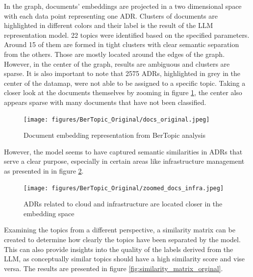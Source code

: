         In the graph, documents' embeddings are projected in a two dimensional space with each data point representing one ADR. Clusters of documents are highlighted in different colors and their label is the result of the LLM representation model. 22 topics were identified based on the specified parameters. Around 15 of them are formed in tight clusters with clear semantic separation from the others. Those are mostly located around the edges of the graph. However, in the center of the graph, results are ambiguous and clusters are sparse. It is also important to note that 2575 ADRs, highlighted in grey in the center of the datamap, were not able to be assigned to a specific topic. Taking a closer look at the documents themselves by zooming in figure \ref{fig:docs_original}, the center also appears sparse with many documents that have not been classified. 
        
        \begin{figure}[h]
            \centering
            \hspace*{-2.2cm} 
            \texttt{[image: figures/BerTopic\_Original/docs\_original.jpeg]}
            \caption{Document embedding representation from BerTopic analysis}
            \label{fig:docs_original}
        \end{figure}
        
        However, the model seems to have captured semantic similarities in ADRs that serve a clear purpose, especially in certain areas like infrastructure management as presented in in figure \ref{fig:infra_docs}.

        \begin{figure}[h]
            \centering
            \texttt{[image: figures/BerTopic\_Original/zoomed\_docs\_infra.jpeg]}
            \caption{ADRs related to cloud and infrastructure are located  closer in the embedding space}
            \label{fig:infra_docs}
        \end{figure}
        
        Examining the topics from a different perspective, a similarity matrix can be created to determine how clearly the topics have been separated by the model. This can also provide insights into the quality of the labels derived from the LLM, as conceptually similar topics should have a high similarity score and vise versa. The results are presented in figure \ref{fig:similarity_matrix_orginal}. 
        
